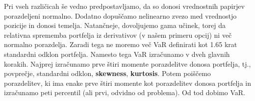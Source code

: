 \documentclass[a4paper, 12pt]{article}
\theoremstyle{definition}
\theoremstyle{plain}
\begin{document}
Pri vseh različicah še vedno predpostavljamo, da so donosi vrednostnih papirjev porazdeljeni normalno. 
Dodatno dopuščamo nelinearno zvezo med vrednostjo pozicije in donosi temelja. Natančneje, dovoljujemo gama učinek,
torej da relativna sprememba portfelja iz derivativov (v našem primeru opcij) ni več normalno porazdelja. 
Zaradi tega ne moremo več VaR definirati kot 1.65 krat standardni odklon portfelja. Namesto tega VaR 
izračunamo v dveh glavnih korakih. Najprej izračunamo prve štiri momente porazdelitve donosa portfelja, tj.,
povprečje, standardni odklon, \textbf{skewness}, \textbf{kurtosis}. Potem poiščemo 
porazdelitev, ki ima enake prve štiri momente kot porazdelitev donosa portfelja in izračunamo peti 
percentil (ali prvi, odvidno od problema). Od tod dobimo VaR.
\end{document}
